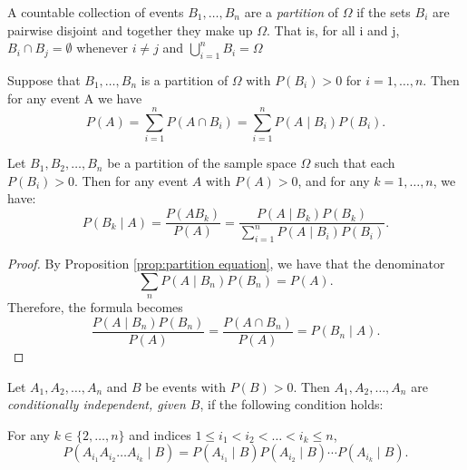 \documentclass[../main.tex]{subfiles}
\begin{document}
\begin{definition}[Partition]\label{def:partition}
A countable collection of events \(B_1, \dots, B_n\) are a \textit{partition} of \(\Omega\) 
if the sets \(B_i\) are pairwise disjoint and together they make up \(\Omega\). 
That is, for all i and j, \( B_i \cap B_j = \emptyset \) whenever \(i \neq j\) 
and \( \bigcup_{i=1}^n B_i = \Omega\)
\end{definition}

\begin{proposition}
    Suppose that \(B_1, \dots, B_n\) is a partition of \(\Omega\) with \(P(B_i) > 0\) for \(i = 1, \dots, n.\) Then for any event A we have
    \[
    P(A) = \sum_{i=1}^n P(A \cap B_i) = \sum_{i=1}^n P(A \mid B_i)P(B_i).
    \]
    
\end{proposition}


\begin{theorem}\label{thm:bayes_formula}
Let \( B_1, B_2, \dots, B_n \) be a partition of the sample space \( \Omega \) such that each \( P(B_i) > 0 \). Then for any event \( A \) with \( P(A) > 0 \), and for any \( k = 1, \dots, n \), we have:
\[
P(B_k \mid A) = \frac{P(A B_k)}{P(A)} = \frac{P(A \mid B_k) P(B_k)}{\sum_{i=1}^{n} P(A \mid B_i) P(B_i)}.
\]
\end{theorem}



\begin{proof}
    By Proposition \ref{prop:partition equation}, we have that the denominator
    \[
    \sum_n P(A \mid B_n) P(B_n) = P(A).
    \]
    Therefore, the formula becomes
    \[
    \frac{P(A \mid B_n) P(B_n)}{P(A)} = \frac{P(A \cap B_n)}{P(A)} = P(B_n \mid A).
    \]
\end{proof}








\begin{definition}\label{def:conditional_independence}
Let \( A_1, A_2, \dots, A_n \) and \( B \) be events with \( P(B) > 0 \). Then \( A_1, A_2, \dots, A_n \) are \textit{conditionally independent, given \( B \)}, if the following condition holds:

For any \( k \in \{2, \dots, n\} \) and indices \( 1 \leq i_1 < i_2 < \dots < i_k \leq n \),
\[
P(A_{i_1} A_{i_2} \dots A_{i_k} \mid B) = P(A_{i_1} \mid B) P(A_{i_2} \mid B) \cdots P(A_{i_k} \mid B).
\]
\end{definition}
\end{document}
